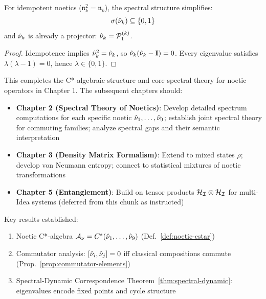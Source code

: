 \begin{corollary}
\label{cor:idem-instant}
For idempotent noetics ($\mathfrak{n}_k^2 = \mathfrak{n}_k$), the spectral structure simplifies:
\[
\sigma(\hat{\nu}_k) \subseteq \{0, 1\}
\]
and $\hat{\nu}_k$ is already a projector: $\hat{\nu}_k = \mathcal{P}_1^{(k)}$.
\end{corollary}

\begin{proof}
Idempotence implies $\hat{\nu}_k^2 = \hat{\nu}_k$, so $\hat{\nu}_k(\hat{\nu}_k - \mathbf{I}) = 0$. Every eigenvalue satisfies $\lambda(\lambda - 1) = 0$, hence $\lambda \in \{0, 1\}$.
\end{proof}

\begin{tcolorbox}[colback=green!5!white,colframe=green!50!black,title=\textbf{Handoff: Next Steps},breakable]
This completes the C*-algebraic structure and core spectral theory for noetic operators in Chapter 1. The subsequent chapters should:
\begin{itemize}
  \item \textbf{Chapter 2 (Spectral Theory of Noetics)}: Develop detailed spectrum computations for each specific noetic $\hat{\nu}_1, \ldots, \hat{\nu}_9$; establish joint spectral theory for commuting families; analyze spectral gaps and their semantic interpretation
  \item \textbf{Chapter 3 (Density Matrix Formalism)}: Extend to mixed states $\rho$; develop von Neumann entropy; connect to statistical mixtures of noetic transformations
  \item \textbf{Chapter 5 (Entanglement)}: Build on tensor products $\mathcal{H}_{\mathcal{I}} \otimes \mathcal{H}_{\mathcal{I}}$ for multi-Idea systems (deferred from this chunk as instructed)
\end{itemize}
Key results established:
\begin{enumerate}
  \item Noetic C*-algebra $\mathcal{A}_\nu = C^*(\hat{\nu}_1, \ldots, \hat{\nu}_9)$ (Def.~\ref{def:noetic-cstar})
  \item Commutator analysis: $[\hat{\nu}_i, \hat{\nu}_j] = 0$ iff classical compositions commute (Prop.~\ref{prop:commutator-elements})
  \item Spectral-Dynamic Correspondence Theorem~\ref{thm:spectral-dynamic}: eigenvalues encode fixed points and cycle structure
\end{enumerate}
\end{tcolorbox}

